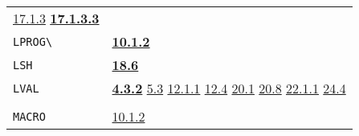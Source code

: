 \documentclass[a4paper]{scrbook}
\begin{document}
\begin{longtable}[]{@{}ll@{}}
\begin{minipage}[t]{0.70\columnwidth}
\href{17-macro-operations.md\#1713-program-defined-macro-characters}{17.1.3}
\textbf{\href{17-macro-operations.md\#17133-parse-and-lparse-finally}{17.1.3.3}}\strut
\end{minipage}\tabularnewline
\begin{minipage}[t]{0.24\columnwidth}\raggedright\strut
\texttt{LPROG\textbackslash{}}\strut
\end{minipage} & \begin{minipage}[t]{0.70\columnwidth}\raggedright\strut
\textbf{\href{10-looping.md\#1012-again-and-return-in-prog-and-repeat-1}{10.1.2}}\strut
\end{minipage}\tabularnewline
\begin{minipage}[t]{0.24\columnwidth}\raggedright\strut
\texttt{LSH}\strut
\end{minipage} & \begin{minipage}[t]{0.70\columnwidth}\raggedright\strut
\textbf{\href{18-machine-words-and-bits.md\#186-bitwise-shifting-operations}{18.6}}\strut
\end{minipage}\tabularnewline
\begin{minipage}[t]{0.24\columnwidth}\raggedright\strut
\texttt{LVAL}\strut
\end{minipage} & \begin{minipage}[t]{0.70\columnwidth}\raggedright\strut
\textbf{\href{04-values-of-atoms.md\#432-lval-1}{4.3.2}}
\href{05-simple-functions.md\#53-application-of-functions-binding-1}{5.3} \href{12-locatives.md\#1211-lloc}{12.1.1}
\href{12-locatives.md\#124-note-on-locatives}{12.4} \href{20-coroutines.md\#201-process-the-type}{20.1}
\href{20-coroutines.md\#208-sneakiness-with-processes}{20.8}
\href{22-storage-management.md\#2211-stacks-and-other-internal-vectors}{22.1.1}
\href{24-efficiency-and-tastefulness.md\#244-global-and-local-values}{24.4}\strut
\end{minipage}\tabularnewline
\begin{minipage}[t]{0.24\columnwidth}\raggedright\strut
\strut
\end{minipage} & \begin{minipage}[t]{0.70\columnwidth}\raggedright\strut
\strut
\end{minipage}\tabularnewline
\begin{minipage}[t]{0.24\columnwidth}\raggedright\strut
\texttt{MACRO}\strut
\end{minipage} & \begin{minipage}[t]{0.70\columnwidth}\raggedright\strut
\href{10-looping.md\#1012-again-and-return-in-prog-and-repeat-1}{10.1.2}

\end{minipage}
\end{longtable}
\end{document}
